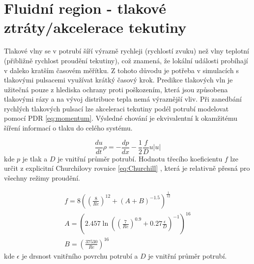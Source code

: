\section{Fluidní region - tlakové ztráty/akcelerace tekutiny}
\label{sec:PressureLoss}
Tlakové vlny se v potrubí šíří výrazně rychleji (rychlostí zvuku) než vlny
teplotní (přibližně rychlost proudění tekutiny), což znamená, že lokální
události probíhají v daleko kratším časovém měřítku. Z tohoto důvodu je potřeba
v simulacích s tlakovými pulsacemi využívat krátký časový krok. Predikce
tlakových vln je užitečná pouze z hlediska ochrany proti poškozením, která
jsou způsobena tlakovými rázy a na vývoj distribuce tepla nemá výraznější vliv.
Při zanedbání rychlých tlakových pulsací lze akceleraci tekutiny podél potrubí
modelovat pomocí PDR \ref{eq:momentum}. Výsledné chování je ekvivalentní k
okamžitému šíření informací o tlaku do celého systému.

\begin{equation}
  \label{eq:momentum}
  \frac{du}{dt}\rho = -\frac{dp}{dx} - \frac{1}{2}\frac{f}{D}u|u|
\end{equation}
kde \(p\) je tlak a \(D\) je vnitřní průměr potrubí. Hodnotu třecího
koeficientu \(f\) lze určit z explicitní Churchilovy rovnice \ref{eq:Churchill}
\cite{Churchill1977}, která je relativně přesná pro všechny režimy proudění.

\begin{equation}
  \label{eq:Churchill}
  \begin{gathered}
    f=8\left(\left(\frac{8}{Re}\right)^{12}+(A+B)^{-1.5}\right)^\frac{1}{12} \\
    A=\left(2.457\ln\left(\left(\frac{7}{Re}\right)^{0.9}
      +0.27\frac{\epsilon}{D}\right)^{-1}\right)^{16} \\
    B=\left(\frac{37530}{Re}\right)^{16}
  \end{gathered}
\end{equation}
kde \(\epsilon\) je drsnost vnitřního povrchu potrubí a \(D\) je vnitřní průměr
potrubí.


